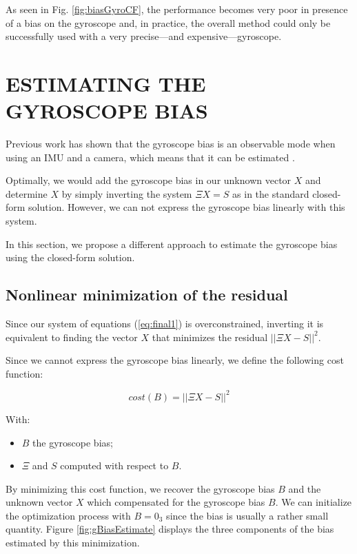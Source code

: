 \documentclass[letterpaper, 10 pt, conference]{ieeeconf}  %
\begin{document}
As seen in Fig. \ref{fig:biasGyroCF}, the performance becomes very poor in presence of a bias on the gyroscope and, in practice, the overall method could only be successfully used with a very precise---and expensive---gyroscope.



\section{ESTIMATING THE GYROSCOPE BIAS}

Previous work has shown that the gyroscope bias is an observable mode when using an IMU and a camera, which means that it can be estimated \cite{Martinelli2012}.

Optimally, we would add the gyroscope bias in our unknown vector $X$ and determine $X$ by simply inverting the system $\Xi X = S$ as in the standard closed-form solution.
However, we can not express the gyroscope bias linearly with this system.

In this section, we propose a different approach to estimate the gyroscope bias using the closed-form solution.

\subsection{Nonlinear minimization of the residual}

Since our system of equations (\ref{eq:final1}) is overconstrained,
inverting it is equivalent to finding the vector $X$ that minimizes the residual $||\Xi X - S||^2$.

Since we cannot express the gyroscope bias linearly,
we define the following cost function:

\begin{equation}
  \label{eq:cost}
  cost(B) = ||\Xi X - S||^2
\end{equation}

With:
\begin{itemize}
\item $B$ the gyroscope bias;
\item $\Xi$ and $S$ computed with respect to $B$.
\end{itemize}

By minimizing this cost function, we recover the gyroscope bias $B$ and the unknown vector $X$ which compensated for the gyroscope bias $B$.
We can initialize the optimization process with $B = 0_3$ since the bias is usually a rather small quantity. Figure \ref{fig:gBiasEstimate} displays the three components of the bias estimated by this minimization.
\end{document}
